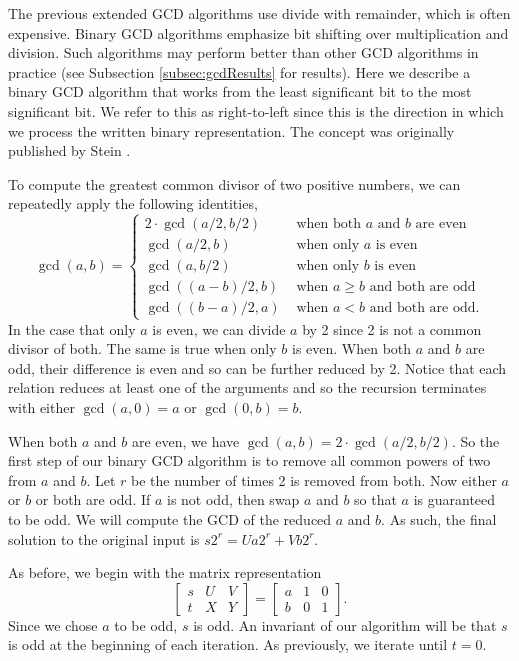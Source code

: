 \documentclass{ucalgthes1}
\theoremstyle{definition}
\newcommand{\matrixThreeTwo}[6]{\left[ \begin{array}{rrr} #1 & #2 & #3 \\ #4 & #5 & #6 \end{array} \right]}
\begin{document}
The previous extended GCD algorithms use divide with remainder, which is often expensive.  Binary GCD algorithms emphasize bit shifting over multiplication and division.  Such algorithms may perform better than other GCD algorithms in practice (see Subsection \ref{subsec:gcdResults} for results).  Here we describe a binary GCD algorithm that works from the least significant bit to the most significant bit.  We refer to this as right-to-left since this is the direction in which we process the written binary representation.  The concept was originally published by Stein \cite{Stein1967}.

To compute the greatest common divisor of two positive numbers, we can repeatedly apply the following identities,
\[
	\gcd(a, b) = \begin{cases}
		2 \cdot \gcd(a/2, b/2) & \textrm{ when both $a$ and $b$ are even} \\
		\gcd(a/2, b) & \textrm{ when only $a$ is even} \\
		\gcd(a, b/2) & \textrm{ when only $b$ is even} \\
		\gcd((a-b)/2, b) & \textrm{ when $a \ge b$ and both are odd} \\
		\gcd((b-a)/2, a) & \textrm{ when $a < b$ and both are odd}.
	\end{cases}
\]
In the case that only $a$ is even, we can divide $a$ by 2 since 2 is not a common divisor of both.  The same is true when only $b$ is even.  When both $a$ and $b$ are odd, their difference is even and so can be further reduced by 2.  Notice that each relation reduces at least one of the arguments and so the recursion terminates with either $\gcd(a, 0) = a$ or $\gcd(0, b) = b$.

When both $a$ and $b$ are even, we have $\gcd(a, b) = 2 \cdot \gcd(a/2, b/2)$.  So the first step of our binary GCD algorithm is to remove all common powers of two from $a$ and $b$.  Let $r$ be the number of times 2 is removed from both.  Now either $a$ or $b$ or both are odd.  If $a$ is not odd, then swap $a$ and $b$ so that $a$ is guaranteed to be odd.  We will compute the GCD of the reduced $a$ and $b$.  As such, the final solution to the original input is $s2^r = Ua2^r + Vb2^r$.

As before, we begin with the matrix representation
\[
	\matrixThreeTwo{s}{U}{V}{t}{X}{Y} = \matrixThreeTwo{a}{1}{0}{b}{0}{1}.
\]
Since we chose $a$ to be odd, $s$ is odd.  An invariant of our algorithm will be that $s$ is odd at the beginning of each iteration.  As previously, we iterate until $t=0$.
\end{document}
